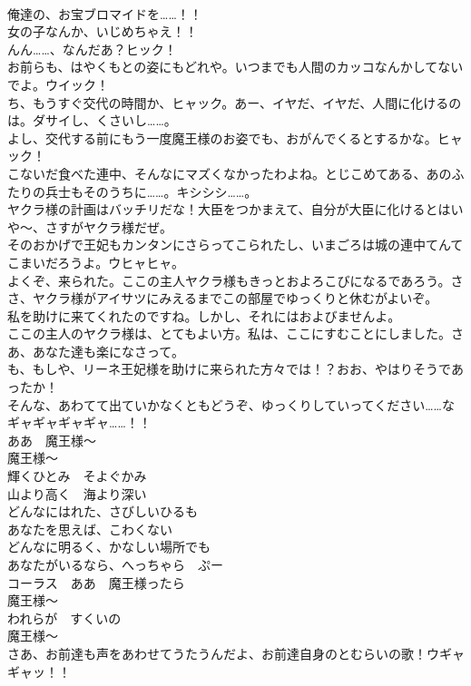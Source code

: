 \documentclass[8pt]{extreport}
\begin{document}
\begin{CJK}{UTF8}{min}
\\	俺達の、お宝ブロマイドを……！！	
\\	女の子なんか、いじめちゃえ！！	
\\	んん……、なんだあ？ヒック！	
\\	お前らも、はやくもとの姿にもどれや。いつまでも人間のカッコなんかしてないでよ。ウイック！	
\\	ち、もうすぐ交代の時間か、ヒャック。あー、イヤだ、イヤだ、人間に化けるのは。ダサイし、くさいし……。	
\\	よし、交代する前にもう一度魔王様のお姿でも、おがんでくるとするかな。ヒャック！	
\\	こないだ食べた連中、そんなにマズくなかったわよね。とじこめてある、あのふたりの兵士もそのうちに……。キシシシ……。	
\\	ヤクラ様の計画はバッチリだな！大臣をつかまえて、自分が大臣に化けるとはいや～、さすがヤクラ様だぜ。	
\\	そのおかげで王妃もカンタンにさらってこられたし、いまごろは城の連中てんてこまいだろうよ。ウヒャヒャ。	
\\	よくぞ、来られた。ここの主人ヤクラ様もきっとおよろこびになるであろう。ささ、ヤクラ様がアイサツにみえるまでこの部屋でゆっくりと休むがよいぞ。	
\\	私を助けに来てくれたのですね。しかし、それにはおよびませんよ。	
\\	ここの主人のヤクラ様は、とてもよい方。私は、ここにすむことにしました。さあ、あなた達も楽になさって。	
\\	も、もしや、リーネ王妃様を助けに来られた方々では！？おお、やはりそうであったか！	
\\	そんな、あわてて出ていかなくともどうぞ、ゆっくりしていってください……なギャギャギャギャ……！！	
\\	ああ　魔王様～
\\	魔王様～
\\	輝くひとみ　そよぐかみ
\\	山より高く　海より深い
\\	どんなにはれた、さびしいひるも
\\	あなたを思えば、こわくない
\\	どんなに明るく、かなしい場所でも
\\	あなたがいるなら、へっちゃら　ぷー
\\	コーラス　ああ　魔王様ったら
\\	魔王様～
\\	われらが　すくいの
\\	魔王様～
\\	さあ、お前達も声をあわせてうたうんだよ、お前達自身のとむらいの歌！ウギャギャッ！！	

\end{CJK}
\end{document}
